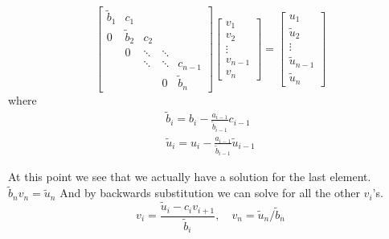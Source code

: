 \documentclass[10pt,a4paper]{article}
\begin{document}
    \[
    \begin{bmatrix}
    \tilde{b}_1 & c_1 &  &  &  \\ 
    0 & \tilde{b}_2 & c_2 &  &  \\ 
    & 0 & \ddots & \ddots &  \\ 
    &  & \ddots & \ddots & c_{n-1} \\ 
    &  &  & 0 & \tilde{b}_n
    \end{bmatrix}
    \begin{bmatrix}
        v_1 \\ 
        v_2 \\ 
        \vdots \\ 
        v_{n-1} \\ 
        v_n
    \end{bmatrix} =
    \begin{bmatrix}
        u_1 \\ 
        \tilde{u}_2 \\ 
        \vdots \\ 
        \tilde{u}_{n-1} \\ 
        \tilde{u}_n
    \end{bmatrix} 
    \]
    where
    \begin{align}
    \tilde{b}_i = b_i - \tfrac{a_{i-1}}{\tilde{b}_{i-1}}c_{i-1}\\
    \tilde{u}_i = u_i - \tfrac{a_{i-1}}{\tilde{b}_{i-1}}\tilde{u}_{i-1}    
    \end{align}

    At this point we see that we actually have a solution for the last element. $\tilde{b}_n v_n = \tilde{u}_n$ And by backwards substitution we can solve for all the other $v_i$'s.
    \begin{equation}
    v_i = \frac{\tilde{u}_i-c_iv_{i+1}}{\tilde{b}_i}, \quad v_n = \tilde{u}_n/\tilde{b}_n
    \end{equation}

	\newpage
\end{document}
